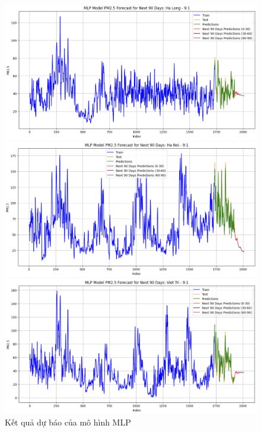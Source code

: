 \begin{figure}[H]
    \begin{minipage}{0.15\textwidth}
        \centering
        \includegraphics[width=1\textwidth, height=0.6\textwidth]{img/final/MLP/90D/MLP_9_1_HL.png}
        \end{minipage}
        \hfill
        \begin{minipage}{0.15\textwidth}
        \centering
        \includegraphics[width=1\textwidth, height=0.6\textwidth]{img/final/MLP/90D/MLP_9_1_HN.png}
        \end{minipage}
        \hfill
        \begin{minipage}{0.15\textwidth}
        \centering
        \includegraphics[width=1\textwidth, height=0.6\textwidth]{img/final/MLP/90D/MLP_9_1_VT.png}
        \end{minipage}
        \hfill
    
    \caption{Kết quả dự báo của mô hình MLP}
    \label{fig:MLP}
    
\end{figure}
